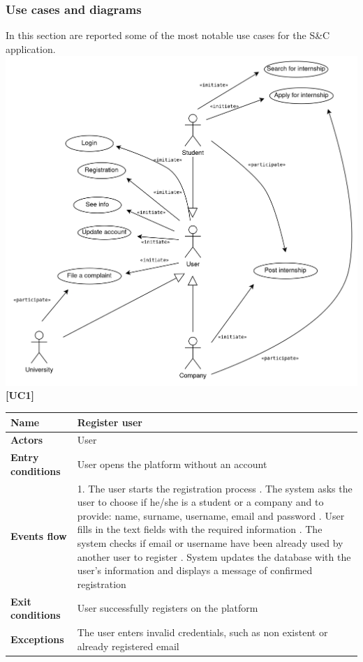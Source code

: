 \documentclass[11pt,twoside]{article}
\begin{document}
		\subsubsection{Use cases and diagrams}
In this section are reported some of the most notable use cases for the S\&C application. \\
\includegraphics[width=\textwidth]{Images/Use_case_diagram}
\\
\large{\textbf{[UC1]}} \\
\begin{table}[H]
\begin{tabular}{| p{} | p{} |}
\hline
\textbf{Name}
& Register user \\
\hline
\textbf{Actors}
& User \\
\hline
\textbf{Entry conditions}
& User opens the platform without an account \\
\hline
\textbf{Events flow}
& 1. The user starts the registration process \newline
2. The system asks the user to choose if he/she is a student or a company and to provide: name, surname, username, email and password \newline
3. User fills in the text fields with the required information \newline
4. The system checks if email or username have been already used by another user to register \newline
5. System updates the database with the user’s information and 
displays a message of confirmed registration  \\
\hline
\textbf{Exit conditions}
& User successfully registers on the platform \\
\hline
\textbf{Exceptions}
& The user enters invalid credentials, such as non existent or already registered email \\
\hline
\end{tabular}
\end{table}
\end{document}
